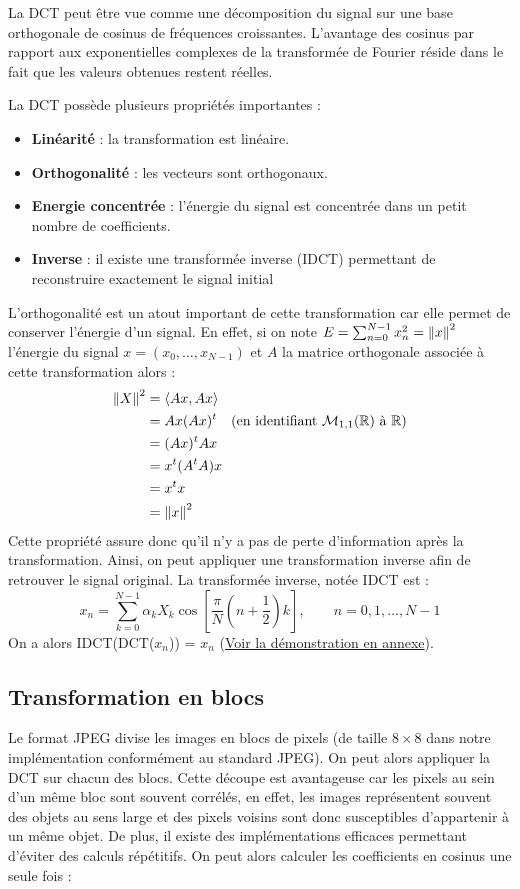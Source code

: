 La DCT peut être vue comme une décomposition du signal sur une base orthogonale de cosinus de fréquences croissantes. L'avantage des cosinus par rapport aux exponentielles complexes de la transformée de Fourier réside dans le fait que les valeurs obtenues restent réelles.

La DCT possède plusieurs propriétés importantes :
\begin{itemize}
    \item \textbf{Linéarité} : la transformation est linéaire.
    \item \textbf{Orthogonalité} : les vecteurs sont orthogonaux.
    \item \textbf{Energie concentrée} : l'énergie du signal est concentrée dans un petit nombre de coefficients.
    \item \textbf{Inverse} : il existe une transformée inverse (IDCT) permettant de reconstruire exactement le signal initial
\end{itemize}

L'orthogonalité est un atout important de cette transformation car elle permet de conserver l'énergie d'un signal. En effet, si on note $ E = \sum_{n=0}^{N-1} x_n^2= \left\|x\right\|^2$ l'énergie du signal $x = (x_0,\dots,x_{N-1})$ et $A$ la matrice orthogonale associée à cette transformation alors :
\begin{align*}
    \left\|X\right\|^2 &= \langle Ax, Ax \rangle \\
               &= Ax (Ax)^t \quad \text{(en identifiant $\mathcal{M}_{1,1}(\mathbb{R})$ à $\mathbb{R}$)} \\
               &= (Ax)^t Ax \\
               &= x^t (A^t A) x \\
               &= x^t x \\
               &= \left\|x\right\|^2
\end{align*}
Cette propriété assure donc qu'il n'y a pas de perte d'information après la transformation. Ainsi, on peut appliquer une transformation inverse afin de retrouver le signal original.
 La transformée inverse, notée IDCT est :
$$x_n = \sum_{k=0}^{N-1}\alpha_k X_k\cos \left[\frac{\pi}{N}\left(n+\frac{1}{2}\right)k\right], \qquad n = 0,1,\dots,N-1$$
On a alors IDCT(DCT($x_n$)) = $x_n$ (\hyperref[preuve-IDCT]{Voir la démonstration en annexe}).
\subsection{Transformation en blocs}
Le format JPEG divise les images en blocs de pixels (de taille $8 \times 8$ dans notre implémentation conformément au standard JPEG). On peut alors appliquer la DCT sur chacun des blocs. 
Cette découpe est avantageuse car les pixels au sein d'un même bloc sont souvent corrélés, en effet, les images représentent souvent des objets au sens large et des pixels voisins sont donc susceptibles d'appartenir à un même objet. De plus, il existe des implémentations efficaces permettant d'éviter des calculs répétitifs. 
On peut alors calculer les coefficients en cosinus une seule fois :

